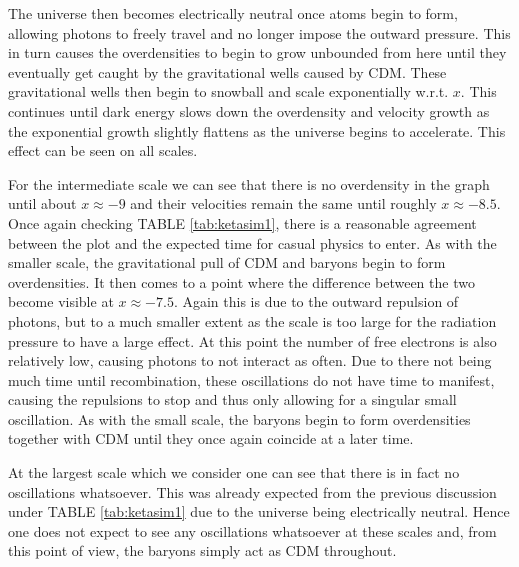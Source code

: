 \documentclass[%
reprint,
 amsmath,amssymb,
 aps,
]{revtex4-2}
\begin{document}
The universe then becomes electrically neutral once atoms begin to form, allowing photons to freely travel and no longer impose the outward pressure. This in turn causes the overdensities to begin to grow unbounded from here until they eventually get caught by the gravitational wells caused by CDM. These gravitational wells then begin to snowball and scale exponentially w.r.t. $x$. This continues until dark energy slows down the overdensity and velocity growth as the exponential growth slightly flattens as the universe begins to accelerate. This effect can be seen on all scales.

For the intermediate scale we can see that there is no overdensity in the graph until about $x\approx-9$ and their velocities remain the same until roughly $x\approx-8.5$. Once again checking TABLE \ref{tab:ketasim1}, there is a reasonable agreement between the plot and the expected time for casual physics to enter. As with the smaller scale, the gravitational pull of CDM and baryons begin to form overdensities. It then comes to a point where the difference between the two become visible at $x\approx-7.5$. Again this is due to the outward repulsion of photons, but to a much smaller extent as the scale is too large for the radiation pressure to have a large effect. At this point the number of free electrons is also relatively low, causing photons to not interact as often. Due to there not being much time until recombination, these oscillations do not have time to manifest, causing the repulsions to stop and thus only allowing for a singular small oscillation. As with the small scale, the baryons begin to form overdensities together with CDM until they once again coincide at a later time.

At the largest scale which we consider one can see that there is in fact no oscillations whatsoever. This was already expected from the previous discussion under TABLE \ref{tab:ketasim1} due to the universe being electrically neutral. Hence one does not expect to see any oscillations whatsoever at these scales and, from this point of view, the baryons simply act as CDM throughout.
\end{document}
